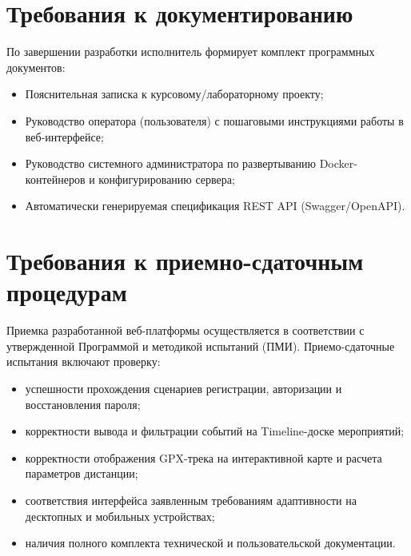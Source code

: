 \documentclass[a4paper,12pt]{article}
\begin{document}
\section{Требования к документированию}

По завершении разработки исполнитель формирует комплект программных документов:
\begin{itemize}
	\item Пояснительная записка к курсовому/лабораторному проекту;
	\item Руководство оператора (пользователя) с пошаговыми инструкциями работы в веб-интерфейсе;
	\item Руководство системного администратора по развертыванию Docker-контейнеров и конфигурированию сервера;
	\item Автоматически генерируемая спецификация REST API (Swagger/OpenAPI).
\end{itemize}

\section{Требования к приемно-сдаточным процедурам}

Приемка разработанной веб-платформы осуществляется в соответствии с утвержденной Программой и методикой испытаний (ПМИ). Приемо-сдаточные испытания включают проверку:
\begin{itemize}
	\item успешности прохождения сценариев регистрации, авторизации и восстановления пароля;
	\item корректности вывода и фильтрации событий на Timeline-доске мероприятий;
	\item корректности отображения GPX-трека на интерактивной карте и расчета параметров дистанции;
	\item соответствия интерфейса заявленным требованиям адаптивности на десктопных и мобильных устройствах;
	\item наличия полного комплекта технической и пользовательской документации.
\end{itemize}
\end{document}

